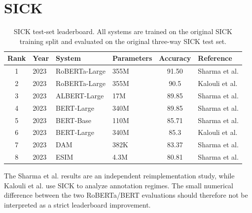 \documentclass[10pt]{article}
\begin{document}
\section*{SICK}
\begin{longtable}{@{}c p{3.2cm} p{3.2cm} p{3.0cm} c p{3.0cm}@{}}
\caption{SICK test-set leaderboard. All systems are trained on the original
SICK training split and evaluated on the original three-way SICK test set.}
\label{tab:sick-literature}\\
\toprule
\textbf{Rank} & \textbf{Year} & \textbf{System} & \textbf{Parameters} & \textbf{Accuracy} & \textbf{Reference} \\
\midrule
1 & 2023 & RoBERTa-Large & 355M & 91.50 & Sharma et al. \cite{sharma2023nli} \\
2 & 2023 & RoBERTa-Large & 355M & 90.5 & Kalouli et al. \cite{kalouli2023sick} \\
3 & 2023 & ALBERT-Large & 17M & 89.85 & Sharma et al. \cite{sharma2023nli} \\
4 & 2023 & BERT-Large & 340M & 89.85 & Sharma et al. \cite{sharma2023nli} \\
5 & 2023 & BERT-Base & 110M & 85.71 & Sharma et al. \cite{sharma2023nli} \\
6 & 2023 & BERT-Large & 340M & 85.3 & Kalouli et al. \cite{kalouli2023sick} \\
7 & 2023 & DAM & 382K & 83.37 & Sharma et al. \cite{sharma2023nli} \\
8 & 2023 & ESIM & 4.3M & 80.81 & Sharma et al. \cite{sharma2023nli} \\
\bottomrule
\end{longtable}

The Sharma et al. results are an independent reimplementation study, while
Kalouli et al. use SICK to analyze annotation regimes. The small numerical
difference between the two RoBERTa/BERT evaluations should therefore not be
interpreted as a strict leaderboard improvement.
\end{document}
